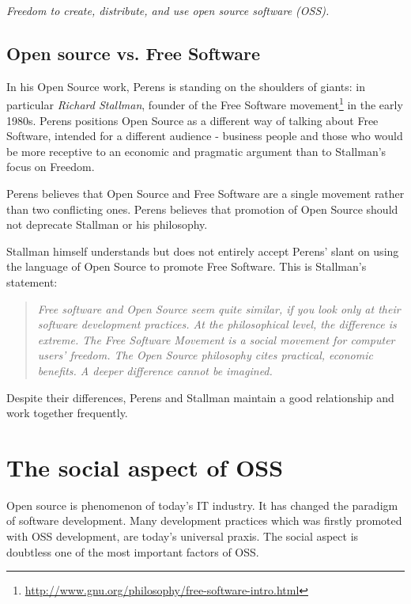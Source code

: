 \documentclass[times, utf8, seminar]{fit}
\begin{document}
\begin{center}
\emph{\large{Freedom to create, distribute, and use open source software (OSS).}}
\end{center}


\subsection{Open source vs. Free Software}

In his Open Source work, Perens is standing on the shoulders of giants: in particular \emph{Richard Stallman}, founder of the Free Software movement\footnote{\url{http://www.gnu.org/philosophy/free-software-intro.html}} in the early 1980s. Perens positions Open Source as a different way of talking about Free Software, intended for a different audience - business people and those who would be more receptive to an economic and pragmatic argument than to Stallman's focus on Freedom\citep{web:perens}.

Perens believes that Open Source and Free Software are a single movement rather than two conflicting ones. Perens believes that promotion of Open Source should not deprecate Stallman or his philosophy.

Stallman himself understands but does not entirely accept Perens' slant on using the language of Open Source to promote Free Software. This is Stallman's statement:

\begin{quotation}
\emph{Free software and Open Source seem quite similar, if you look only at their software development practices. At the philosophical level, the difference is extreme. The Free Software Movement is a social movement for computer users' freedom. The Open Source philosophy cites practical, economic benefits. A deeper difference cannot be imagined.}
\end{quotation}

Despite their differences, Perens and Stallman maintain a good relationship and work together frequently.

\section{The social aspect of OSS}

Open source is phenomenon of today's IT industry. It has changed the paradigm of software development. Many development practices which was firstly promoted with OSS development, are today's universal praxis. The social aspect is doubtless one of the most important factors of OSS.
\end{document}

